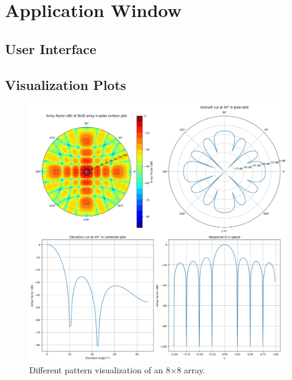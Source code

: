 \chapter{Application Window} \label{ch: application-window}

\section{User Interface}
\section{Visualization Plots}

\clearpage
\begin{figure}[H]
	\centering
	\hspace*{-1.8cm}
	\includegraphics[scale=0.56]{images//plots} %
	\caption{Different pattern visualization of an 8$\times$8 array.}
\end{figure}